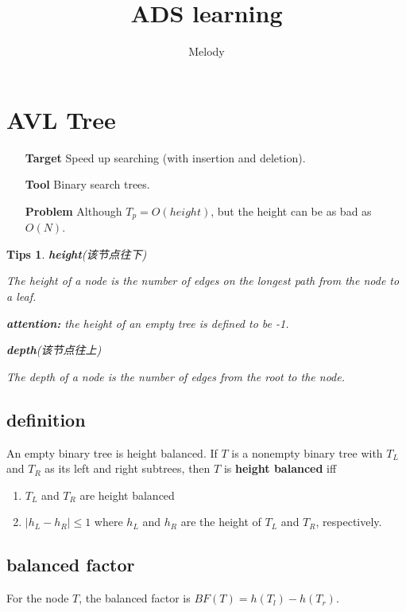 \documentclass{article}
\author{Melody}
\title{ADS learning}
\newtheorem*{Tips}{Tips}
\begin{document}
\maketitle
\tableofcontents
\newpage

\section{AVL Tree}
\hypertarget{AVL}{}

\begin{itemize}
    \item [\textbf{Target}] Speed up searching (with insertion and deletion). 
    \item [\textbf{Tool}] Binary search trees. 
    \item [\textbf{Problem}] Although $T_p=O(height)$, but the height can be as bad as $O(N)$. 
\end{itemize}

\begin{Tips}
    \item \textbf{height}(该节点往下)\par
    The height of a node is the number of edges on the longest path from the node to a leaf.\par
    \textbf{attention:} the height of an empty tree is defined to be -1.
    \item \textbf{depth}(该节点往上)\par
    The depth of a node is the number of edges from the root to the node.
\end{Tips}

\subsection{definition}
An empty binary tree is height balanced. If $T$ is a nonempty binary tree with $T_L$ and $T_R$ as its left and right subtrees, then $T$ is {\textbf{\color{red}height balanced}} iff
\begin{enumerate}
    \item $T_L$ and $T_R$ are height balanced
    \item $|h_L -h_R|\le 1$ where $h_L$ and $h_R$ are the height of $T_L$ and $T_R$, respectively. 
\end{enumerate}

\subsection{balanced factor}
For the node $T$, the balanced factor is $BF(T)=h(T_l)-h(T_r)$.
\end{document}
